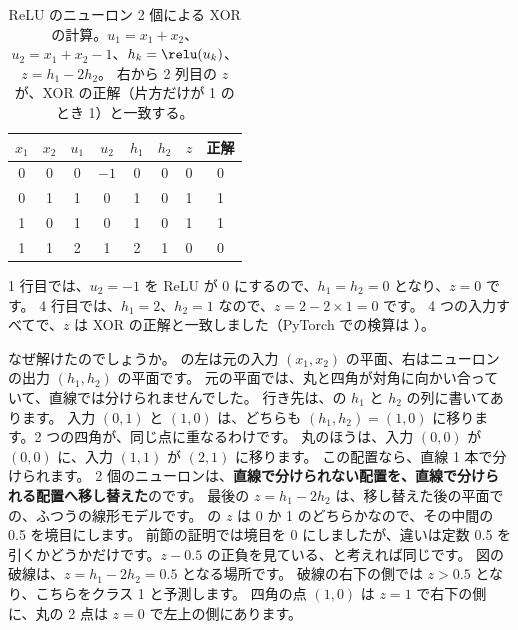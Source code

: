 \begin{table}[tbp]
\centering
\caption{ReLU のニューロン 2 個による XOR の計算。$u_1=x_1+x_2$、$u_2=x_1+x_2-1$、$h_k=\relu(u_k)$、$z=h_1-2h_2$。
右から 2 列目の $z$ が、XOR の正解（片方だけが 1 のとき 1）と一致する。}
\label{tab:nn-xor-hand}
\small
\begin{tabular}{cccccccc}
\toprule
$x_1$ & $x_2$ & $u_1$ & $u_2$ & $h_1$ & $h_2$ & $z$ & 正解 \\
\midrule
0 & 0 & 0 & $-1$ & 0 & 0 & 0 & 0 \\
0 & 1 & 1 & 0 & 1 & 0 & 1 & 1 \\
1 & 0 & 1 & 0 & 1 & 0 & 1 & 1 \\
1 & 1 & 2 & 1 & 2 & 1 & 0 & 0 \\
\bottomrule
\end{tabular}
\end{table}

1 行目では、$u_2=-1$ を ReLU が 0 にするので、$h_1=h_2=0$ となり、$z=0$ です。
4 行目では、$h_1=2$、$h_2=1$ なので、$z=2-2\times 1=0$ です。
4 つの入力すべてで、$z$ は XOR の正解と一致しました（PyTorch での検算は ）。

なぜ解けたのでしょうか。
の左は元の入力 $(x_1,x_2)$ の平面、右はニューロンの出力 $(h_1,h_2)$ の平面です。
元の平面では、丸と四角が対角に向かい合っていて、直線では分けられませんでした。
行き先は、の $h_1$ と $h_2$ の列に書いてあります。
入力 $(0,1)$ と $(1,0)$ は、どちらも $(h_1,h_2)=(1,0)$ に移ります。2 つの四角が、同じ点に重なるわけです。
丸のほうは、入力 $(0,0)$ が $(0,0)$ に、入力 $(1,1)$ が $(2,1)$ に移ります。
この配置なら、直線 1 本で分けられます。
2 個のニューロンは、\textbf{直線で分けられない配置を、直線で分けられる配置へ移し替えた}のです。
最後の $z=h_1-2h_2$ は、移し替えた後の平面での、ふつうの線形モデルです。
の $z$ は 0 か 1 のどちらかなので、その中間の 0.5 を境目にします。
前節の証明では境目を 0 にしましたが、違いは定数 0.5 を引くかどうかだけです。$z-0.5$ の正負を見ている、と考えれば同じです。
図の破線は、$z=h_1-2h_2=0.5$ となる場所です。
破線の右下の側では $z>0.5$ となり、こちらをクラス 1 と予測します。
四角の点 $(1,0)$ は $z=1$ で右下の側に、丸の 2 点は $z=0$ で左上の側にあります。


